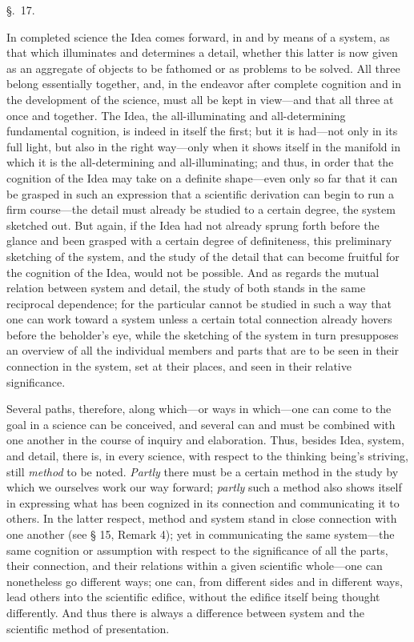 \documentclass[12pt,a4paper]{book}
\begin{document}
\begin{center}\large\S.~17.\end{center}
In completed science the Idea comes forward, in and by means of a system, as that which
illuminates and determines a detail, whether this latter is now given as an aggregate of
objects to be fathomed or as problems to be solved. All three belong essentially together,
and, in the endeavor after complete cognition and in the development of the science, must
all be kept in view---and that all three at once and together. The Idea, the all-illuminating
and all-determining fundamental cognition, is indeed in itself the first; but it is
had---not only in its full light, but also in the right way---only when it shows itself in the
manifold in which it is the all-determining and all-illuminating; and thus, in order that the
cognition of the Idea may take on a definite shape---even only so far that it can be grasped
in such an expression that a scientific derivation can begin to run a firm course---the
detail must already be studied to a certain degree, the system sketched out. But again, if
the Idea had not already sprung forth before the glance and been grasped with a certain
degree of definiteness, this preliminary sketching of the system, and the study of the
detail that can become fruitful for the cognition of the Idea, would not be possible. And as
regards the mutual relation between system and detail, the study of both stands in the same
reciprocal dependence; for the particular cannot be studied in such a way that one can work
toward a system unless a certain total connection already hovers before the beholder's eye,
while the sketching of the system in turn presupposes an overview of all the individual
members and parts that are to be seen in their connection in the system, set at their places,
and seen in their relative significance.

Several paths, therefore, along which---or ways in which---one can come to the goal in a
science can be conceived, and several can and must be combined with one another in the course
of inquiry and elaboration. Thus, besides Idea, system, and detail, there is, in every
science, with respect to the thinking being's striving, still \emph{method} to be noted.
\emph{Partly} there must be a certain method in the study by which we ourselves work our way
forward; \emph{partly} such a method also shows itself in expressing what has been cognized in its
connection and communicating it to others. In the latter respect, method and system stand in
close connection with one another (see § 15, Remark 4); yet in communicating the same
system---the same cognition or assumption with respect to the significance of all the parts,
their connection, and their relations within a given scientific whole---one can nonetheless go
different ways; one can, from different sides and in different ways, lead others into the
scientific edifice, without the edifice itself being thought differently. And thus there is
always a difference between system and the scientific method of presentation.
\end{document}
